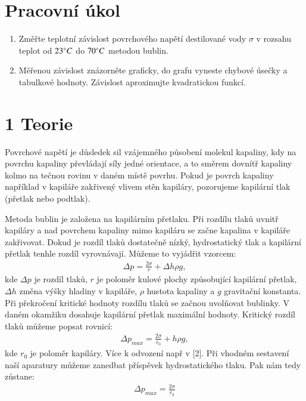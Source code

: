 \documentclass[a4paper]{article}
\author{"Václav Kubíček"}
\begin{document}
\section*{Pracovní úkol}
\begin{enumerate}%
\item Změřte teplotní závislost povrchového napětí destilované vody $\sigma$ v rozsahu teplot od $23\degree C$ do $70\degree C$ metodou bublin.
\item Měřenou závislost znázorněte graficky, do grafu vyneste chybové úsečky a tabulkové hodnoty. Závislost aproximujte kvadratickou funkcí.
\end{enumerate}

\section*{1 Teorie}
Povrchové napětí je důsledek sil vzájemného působení molekul kapaliny, kdy na povrchu kapaliny převládají síly jedné orientace, a to směrem dovnítř kapaliny kolmo na tečnou rovinu v daném místě povrhu. Pokud je povrch kapaliny například v kapiláře zakřivený vlivem stěn kapiláry, pozorujeme kapilární tlak (přetlak nebo podtlak).
\par Metoda bublin je založena na kapilárním přetlaku. Při rozdílu tlaků uvnitř kapiláry a nad povrchem kapaliny mimo kapiláru se začne kapalina v kapiláře zakřivovat. Dokud je rozdíl tlaků dostatečně nízký, hydrostatický tlak  a kapilární přetlak tenhle rozdíl vyrovnávají. Můžeme to vyjádřit vzorcem:
\begin{align}
    \Delta p = \frac{2\sigma}{r}+\Delta h\rho g, 
\end{align}
kde $\Delta p $ je rozdíl tlaků, $r$ je poloměr kulové plochy způsobující kapilární přetlak, $\Delta h$ změna výšky hladiny v kapiláře, $\rho$ hustota kapaliny a $g$ gravitační konstanta. Při překročení kritické hodnoty rozdílu tlaků se začnou uvolňovat bublinky. V daném okamžiku dosahuje kapilární přetlak maximální hodnoty. Kritický rozdíl tlaků můžeme popsat rovnicí:
\begin{align}
    \Delta p_{max} = \frac{2\sigma}{r_0}+ h\rho g, 
\end{align}
kde $r_0$ je poloměr kapiláry. Více k odvození např v [2]. Při vhodném sestavení naší aparatury můžeme zanedbat příspěvek hydrostatického tlaku. Pak nám tedy zůstane:
\begin{align}
    \Delta p_{max} = \frac{2\sigma}{r_0}
\end{align}
\par
\end{document}
